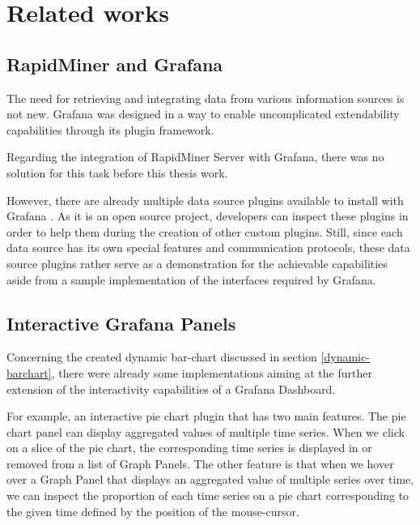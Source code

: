 \chapter{Related works}

%
%
%


\section{RapidMiner and Grafana}

The need for retrieving and integrating data from various information sources is not new. Grafana was designed in a way to enable uncomplicated extendability capabilities through its plugin framework.



Regarding the integration of RapidMiner Server with Grafana, there was no solution for this task before this thesis work.

However, there are already multiple data source plugins available to install with Grafana \cite{grafana-datasource-plugins}. As it is an open source project, developers can inspect these plugins in order to help them during the creation of other custom plugins. Still, since each data source has its own special features and communication protocols, these data source plugins rather serve as a demonstration for the achievable capabilities aside from a sample implementation of the interfaces required by Grafana.

\section{Interactive Grafana Panels}
%

Concerning the created dynamic bar-chart discussed in section \ref{dynamic-barchart}, there were already some implementations aiming at the further extension of the interactivity capabilities of a Grafana Dashboard.

For example, an interactive pie chart plugin that has two main features. The pie chart panel can display aggregated values of multiple time series. When we click on a slice of the pie chart, the corresponding time series is displayed in or removed from a list of Graph Panels. The other feature is that when we hover over a Graph Panel that displays an aggregated value of multiple series over time, we can inspect the proportion of each time series on a pie chart corresponding to the given time defined by the position of the mouse-cursor.

